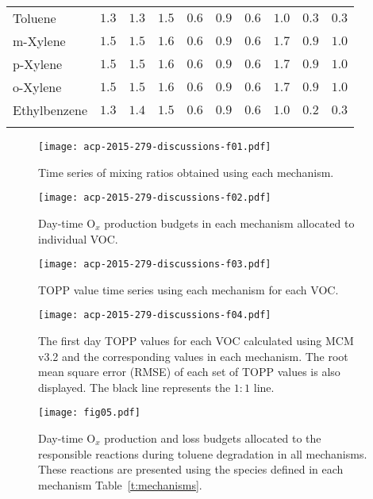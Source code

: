 \documentclass[acpd, online, hvmath]{copernicus}
\providecommand{\DIFaddbeginFL}{} %
\providecommand{\DIFaddendFL}{} %
\providecommand{\DIFdelbeginFL}{} %
\providecommand{\DIFdelendFL}{} %
\begin{document}
\begin{table}
{\begin{tabular}{llllllllll}
      Toluene &$1.3$ &$1.3$ &$1.5$ &$0.6$ &$0.9$ &$0.6$ &$1.0$ &$0.3$ &$0.3$ \\
      m-Xylene &$1.5$ &$1.5$ &$1.6$ &$0.6$ &$0.9$ &$0.6$ &$1.7$ &$0.9$ &$1.0$ \\
      p-Xylene &$1.5$ &$1.5$ &$1.6$ &$0.6$ &$0.9$ &$0.6$ &$1.7$ &$0.9$ &$1.0$ \\
      o-Xylene &$1.5$ &$1.5$ &$1.6$ &$0.6$ &$0.9$ &$0.6$ &$1.7$ &$0.9$ &$1.0$ \\
      Ethylbenzene &$1.3$ &$1.4$ &$1.5$ &$0.6$ &$0.9$ &$0.6$ &$1.0$ &$0.2$ &$0.3$ \\
      \bottomhline
    \end{tabular}}
    \label{t:cumulative_TOPPs_per_C}
\end{table}



\begin{figure}[t]
    \texttt{[image: acp-2015-279-discussions-f01.pdf]}
    \caption{Time series of  mixing ratios obtained using
      each mechanism.}
    \label{f:time_series}
\end{figure}
\begin{figure}
    \texttt{[image: acp-2015-279-discussions-f02.pdf]}
    \caption{Day-time O$_{x}$ production budgets in each mechanism
      allocated to individual VOC.}
    \label{f:Ox_tagged_budgets}
\end{figure}
\begin{figure}[t]
  \texttt{[image: acp-2015-279-discussions-f03.pdf]}
  \caption{TOPP value time series using each mechanism for each VOC.}
  \label{f:TOPP_dailies}
\end{figure}
\begin{figure}[t]
  \texttt{[image: acp-2015-279-discussions-f04.pdf]}
  \caption{The first day TOPP values for each VOC calculated using MCM
    v3.2 and the corresponding values in each mechanism. The root mean
    square error (RMSE) of each set of TOPP values is also
    displayed. The black line represents the $1:1$ line.}
    \label{f:first_day}
\end{figure}
\begin{figure}[t]
    \DIFdelbeginFL %
\DIFdelendFL \DIFaddbeginFL \texttt{[image: fig05.pdf]}
    \DIFaddendFL \caption{Day-time O$_{x}$ production and loss budgets allocated
      to the responsible reactions during toluene degradation in all
      mechanisms. These reactions are presented using the species
      defined in each mechanism Table~\ref{t:mechanisms}.}
    \label{f:toluene_Ox}
\end{figure}
\end{document}
